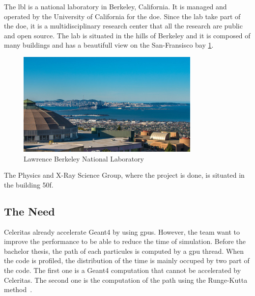 The \acrfull{lbl} is a national laboratory in Berkeley, California.
It is managed and operated by the University of California for the \acrfull{doe}.
Since the lab take part of the \acrshort{doe}, it is a multidisciplinary research center that all the research are public and open source.
The lab is situated in the hills of Berkeley and it is composed of many buildings and has a beautifull view on the San-Fransisco bay \ref{spec:fig:context:lbl:lab-view}.

\begin{figure}[ht]
    \centering
    \includegraphics[width=0.8\textwidth]{05-resources/img/spec/lab-view.jpg}
    \caption{Lawrence Berkeley National Laboratory}
    \label{spec:fig:context:lbl:lab-view}
\end{figure}


The Physics and X-Ray Science Group, where the project is done, is situated in the building 50f.


\subsection{The Need}
\label{spec:ch:context:celeritas:need}

Celeritas already accelerate Geant4 by using \acrshort{gpu}s.
However, the team want to improve the performance to be able to reduce the time of simulation.
Before the bachelor thesis, the path of each particules is computed by a \acrshort{gpu} thread.
When the code is profiled, the distribution of the time is mainly occuped by two part of the code.
The first one is a Geant4 computation that cannot be accelerated by Celeritas.
The second one is the computation of the path using the Runge-Kutta method~\cite{Runge-Kutta-methods}.

